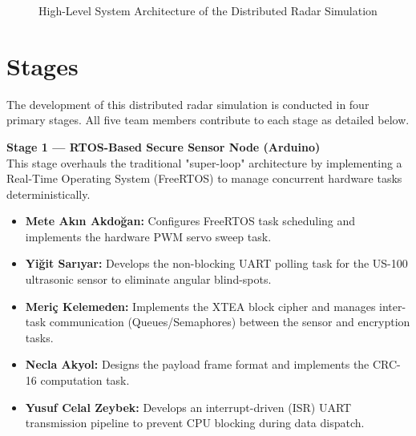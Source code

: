 \documentclass[14pt]{article}
\begin{document}
\begin{figure}[htbp]
{
}
\caption{High-Level System Architecture of the Distributed Radar Simulation}
\label{fig:system_architecture}
\end{figure}

\section{Stages}

The development of this distributed radar simulation is conducted in four primary stages. All five team members contribute to each stage as detailed below.

\textbf{Stage 1 --- RTOS-Based Secure Sensor Node (Arduino)} \\
This stage overhauls the traditional "super-loop" architecture by implementing a Real-Time Operating System (FreeRTOS) to manage concurrent hardware tasks deterministically.
\begin{itemize}
    \item \textbf{Mete Akın Akdoğan:} Configures FreeRTOS task scheduling and implements the hardware PWM servo sweep task.
    \item \textbf{Yiğit Sarıyar:} Develops the non-blocking UART polling task for the US-100 ultrasonic sensor to eliminate angular blind-spots.
    \item \textbf{Meriç Kelemeden:} Implements the XTEA block cipher and manages inter-task communication (Queues/Semaphores) between the sensor and encryption tasks.
    \item \textbf{Necla Akyol:} Designs the payload frame format and implements the CRC-16 computation task.
    \item \textbf{Yusuf Celal Zeybek:} Develops an interrupt-driven (ISR) UART transmission pipeline to prevent CPU blocking during data dispatch.
\end{itemize}
\end{document}
